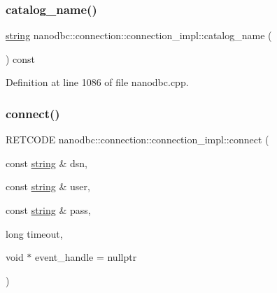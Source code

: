 \mbox{\label{classnanodbc_1_1connection_1_1connection__impl_a3af94422ff91ff54e39d4d98557ed315}} 
\subsubsection{\texorpdfstring{catalog\_name()}{catalog\_name()}}
{\footnotesize\ttfamily \mbox{\hyperlink{namespacenanodbc_abfc0ece56278e590911ec8352774c212}{string}} nanodbc\+::connection\+::connection\+\_\+impl\+::catalog\+\_\+name (\begin{DoxyParamCaption}{ }\end{DoxyParamCaption}) const\hspace{0.3cm}{\ttfamily [inline]}}



Definition at line 1086 of file nanodbc.\+cpp.

\mbox{\label{classnanodbc_1_1connection_1_1connection__impl_a6ed45f56511103a8ecd44c86f9da7460}} 
\subsubsection{\texorpdfstring{connect()}{connect()}\hspace{0.1cm}{\footnotesize\ttfamily [1/2]}}
{\footnotesize\ttfamily R\+E\+T\+C\+O\+DE nanodbc\+::connection\+::connection\+\_\+impl\+::connect (\begin{DoxyParamCaption}\item[{const \mbox{\hyperlink{namespacenanodbc_abfc0ece56278e590911ec8352774c212}{string}} \&}]{dsn,  }\item[{const \mbox{\hyperlink{namespacenanodbc_abfc0ece56278e590911ec8352774c212}{string}} \&}]{user,  }\item[{const \mbox{\hyperlink{namespacenanodbc_abfc0ece56278e590911ec8352774c212}{string}} \&}]{pass,  }\item[{long}]{timeout,  }\item[{void $\ast$}]{event\+\_\+handle = {\ttfamily nullptr} }\end{DoxyParamCaption})\hspace{0.3cm}{\ttfamily [inline]}}



